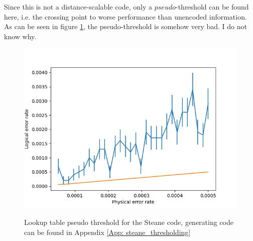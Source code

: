 Since this is not a distance-scalable code, only a $pseudo$-threshold can
be found here, i.e. the crossing point to worse performance than unencoded
information. As can be seen in figure \ref{fig: steane_threshold}, the
pseudo-threshold is somehow very bad. I do not know why.

\begin{figure}[h!]
	\begin{center}
	\captionsetup{justification=centering,margin=2cm}
	\includegraphics[scale=0.7]{./img/figures/thresholds/steaneLookupThreshold.png}\\
	\caption{Lookup table pseudo threshold for the Steane code, generating code can be found in Appendix
    \ref{App: steane_thresholding}}
        
	\label{fig: steane_threshold}
	\end{center}
\end{figure}